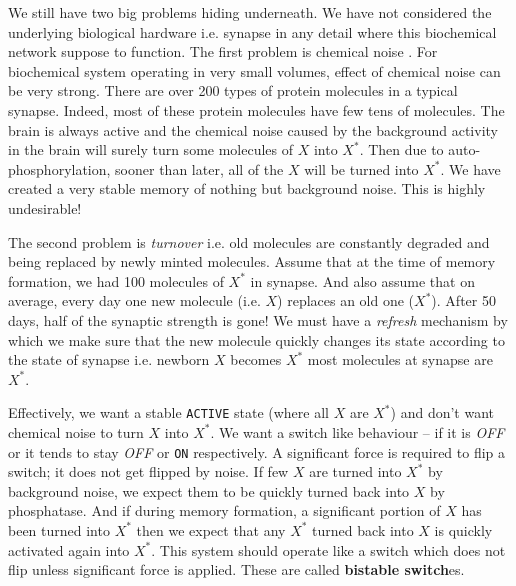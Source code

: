 \documentclass[]{resonance}
\begin{document}
We still have two big problems hiding underneath. We have not considered the
underlying biological hardware i.e. synapse in any detail where this biochemical
network suppose to function. The first problem is chemical noise 
. For biochemical system operating in very small volumes,
effect of chemical noise can be very strong.  There are over 200 types of
protein molecules in a typical synapse. Indeed, most of these protein molecules have few
tens of molecules.  The brain is always active and  the chemical noise caused by
the background activity in the brain will surely turn some molecules of $X$ into
$X^*$. Then due to auto-phosphorylation, sooner than later, all of the $X$ will be turned
into $X^*$. We have created a very stable memory of nothing but background
noise. This is highly undesirable!

The second problem is \textit{turnover} i.e. old molecules are constantly degraded
and being replaced by newly minted molecules. Assume that at the time of memory
formation, we had 100 molecules of $X^*$ in synapse. And also assume that on
average, every day one new molecule (i.e. $X$) replaces an old one ($X^*$).
After 50 days, half of the synaptic strength is gone! We must have a
\textit{refresh} mechanism by which we make sure that the new molecule quickly
changes its state according to the state of synapse i.e. newborn $X$ becomes
$X^*$ most molecules at synapse are $X^*$.

Effectively, we want a stable \texttt{ACTIVE} state (where all $X$ are $X^*$)
and don't want chemical noise to turn $X$ into $X^*$. We want a switch like
behaviour -- if it is \textit{OFF} or  it tends to stay \textit{OFF} or
\texttt{ON} respectively. A significant force is required to flip a switch; it
does not get flipped by noise. If few $X$ are turned into $X^*$ by background
noise, we expect them to be quickly turned back into $X$ by phosphatase. And if
during memory formation, a significant portion of $X$ has been turned into $X^*$
then we expect that any $X^*$ turned back into $X$ is quickly activated again
into $X^*$.  This system should operate like a switch which does not flip unless
significant force is applied. These are called \textbf{bistable switch}es. 
\end{document}
